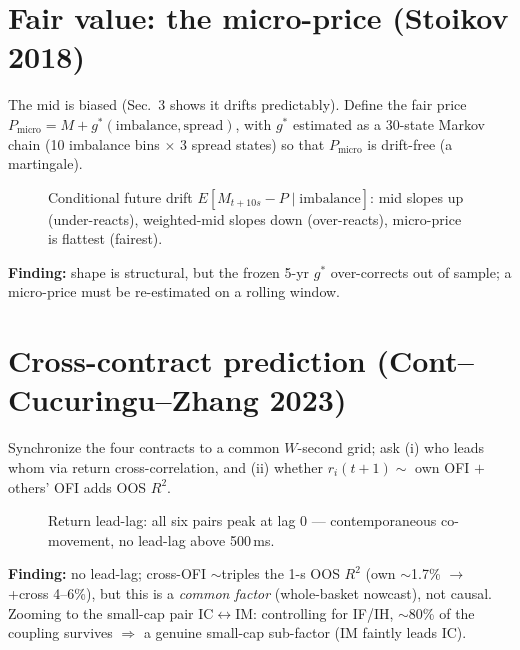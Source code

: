 \documentclass[11pt]{article}
\begin{document}
\section{Fair value: the micro-price (Stoikov 2018)}
The mid is biased (Sec.~3 shows it drifts predictably). Define the fair price
$P_{\text{micro}} = M + g^*(\text{imbalance},\text{spread})$, with $g^*$ estimated as a
30-state Markov chain (10 imbalance bins $\times$ 3 spread states) so that $P_{\text{micro}}$
is drift-free (a martingale).
\begin{figure}[H]\centering
  \caption{Conditional future drift $E[M_{t+10s}-P\mid \text{imbalance}]$: mid slopes up
  (under-reacts), weighted-mid slopes down (over-reacts), micro-price is flattest (fairest).}
  \label{fig:micro}
\end{figure}
\textbf{Finding:} shape is structural, but the frozen 5-yr $g^*$ over-corrects out of sample;
a micro-price must be re-estimated on a rolling window.

\section{Cross-contract prediction (Cont--Cucuringu--Zhang 2023)}
Synchronize the four contracts to a common $W$-second grid; ask (i) who leads whom via return
cross-correlation, and (ii) whether $r_i(t{+}1)\sim$ own OFI $+$ others' OFI adds OOS $R^2$.
\begin{figure}[H]\centering
  \caption{Return lead-lag: all six pairs peak at lag 0 --- contemporaneous co-movement, no
  lead-lag above 500\,ms.}
  \label{fig:cross}
\end{figure}
\textbf{Finding:} no lead-lag; cross-OFI $\sim$triples the 1-s OOS $R^2$ (own $\sim$1.7\%
$\to$ +cross 4--6\%), but this is a \emph{common factor} (whole-basket nowcast), not causal.
Zooming to the small-cap pair IC$\leftrightarrow$IM: controlling for IF/IH, $\sim$80\% of the
coupling survives $\Rightarrow$ a genuine small-cap sub-factor (IM faintly leads IC).
\end{document}
